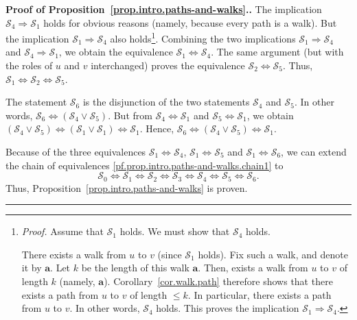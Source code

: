 \documentclass[numbers=enddot,12pt,final,onecolumn,notitlepage]{scrartcl}%
\theoremstyle{definition}
\newenvironment{proof}[1][Proof]{\noindent\textbf{#1.} }{\ \rule{0.5em}{0.5em}}
\newcommand{\tup}[1]{\left( #1 \right)}
\begin{document}
\begin{proof}[Proof of Proposition~\ref{prop.intro.paths-and-walks}.]
The implication $\mathcal{S}_4 \Longrightarrow \mathcal{S}_1$ holds
for obvious reasons (namely, because every path is a walk). But
the implication $\mathcal{S}_1 \Longrightarrow \mathcal{S}_4$ also
holds\footnote{\textit{Proof.} Assume that $\mathcal{S}_1$
holds. We must show that $\mathcal{S}_4$ holds.

There exists a walk from $u$ to $v$ (since $\mathcal{S}_1$ holds).
Fix such a walk, and denote it by $\mathbf{a}$. Let $k$ be the length
of this walk $\mathbf{a}$. Then, exists a walk from $u$ to $v$ of
length $k$ (namely, $\mathbf{a}$). Corollary~\ref{cor.walk.path}
therefore shows that there exists a path from $u$ to $v$ of length
$\leq k$. In particular, there exists a path from $u$ to $v$. In other
words, $\mathcal{S}_4$ holds. This proves the implication
$\mathcal{S}_1 \Longrightarrow \mathcal{S}_4$.}. Combining the two
implications $\mathcal{S}_1 \Longrightarrow \mathcal{S}_4$ and
$\mathcal{S}_4 \Longrightarrow \mathcal{S}_1$, we obtain the
equivalence
$\mathcal{S}_1 \Longleftrightarrow \mathcal{S}_4$. The same argument
(but with the roles of $u$ and $v$ interchanged) proves the
equivalence
$\mathcal{S}_2 \Longleftrightarrow \mathcal{S}_5$. Thus,
$\mathcal{S}_1 \Longleftrightarrow \mathcal{S}_2
\Longleftrightarrow \mathcal{S}_5$.

The statement $\mathcal{S}_6$ is the disjunction of the two statements
$\mathcal{S}_4$ and $\mathcal{S}_5$. In other words,
$\mathcal{S}_6 \Longleftrightarrow
\tup{\mathcal{S}_4 \vee \mathcal{S}_5}$. But from
$\mathcal{S}_4 \Longleftrightarrow \mathcal{S}_1$ and
$\mathcal{S}_5 \Longleftrightarrow \mathcal{S}_1$, we obtain
$\tup{\mathcal{S}_4 \vee \mathcal{S}_5}
\Longleftrightarrow \tup{\mathcal{S}_1 \vee \mathcal{S}_1}
\Longleftrightarrow \mathcal{S}_1$. Hence,
$\mathcal{S}_6 \Longleftrightarrow
\tup{\mathcal{S}_4 \vee \mathcal{S}_5}
\Longleftrightarrow \mathcal{S}_1$.

Because of the three equivalences
$\mathcal{S}_1 \Longleftrightarrow \mathcal{S}_4$,
$\mathcal{S}_1 \Longleftrightarrow \mathcal{S}_5$ and
$\mathcal{S}_1 \Longleftrightarrow \mathcal{S}_6$, we can extend the
chain of equivalences \eqref{pf.prop.intro.paths-and-walks.chain1}
to
\[
\mathcal{S}_0 \Longleftrightarrow \mathcal{S}_1 \Longleftrightarrow
\mathcal{S}_2 \Longleftrightarrow \mathcal{S}_3 \Longleftrightarrow
\mathcal{S}_4 \Longleftrightarrow \mathcal{S}_5 \Longleftrightarrow
\mathcal{S}_6 .
\]
Thus, Proposition~\ref{prop.intro.paths-and-walks} is proven.
\end{proof}
\end{document}
